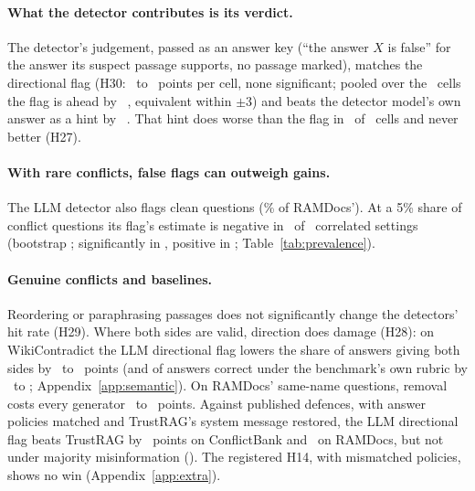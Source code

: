 \paragraph{What the detector contributes is its verdict.} The detector's judgement, passed as an answer key (``the
answer $X$ is false'' for the answer its suspect passage supports, no passage marked), matches the directional flag
(H30: \hThirtyAMin\ to \hThirtyAMax\ points per cell, none significant; pooled over the \PoolThirtyAK\ cells the flag
is ahead by \PoolThirtyA\ \PoolThirtyACI, equivalent within $\pm$3) and beats the detector model's own answer as a
hint by \PoolThirtyB\ \PoolThirtyBCI. That hint does worse than the flag in \nHTwentySevenAPos\ of
\nHTwentySevenATests\ cells and never better (H27).

\paragraph{With rare conflicts, false flags can outweigh gains.} The LLM detector also flags clean questions
(\cleanFprLlm\% of RAMDocs'). At a 5\% share of conflict questions its flag's estimate is negative in \prevNegFive\ of \prevN\ correlated settings
(bootstrap \prevNegFiveCI; significantly in \prevSigNeg, positive in \prevSigPos; Table~\ref{tab:prevalence}).

\paragraph{Genuine conflicts and baselines.} Reordering \citep{liu2024lost} or paraphrasing passages does not significantly
change the detectors' hit rate (H29). Where both sides are valid, direction does damage (H28): on WikiContradict the LLM directional
flag lowers the share of answers giving both sides by \ahTwentyEightWcMiniDir\ to \ahTwentyEightWcLunaDir\ points
(and of answers correct under the benchmark's own rubric by \awikiOrigMiniEffPt\ to \awikiOrigLunaEffPt;
Appendix~\ref{app:semantic}). On RAMDocs' same-name questions, removal costs every generator
\ahTwentyEightAmbMiniRem\ to \ahTwentyEightAmbLunaRem\ points. Against published defences, with answer policies matched and TrustRAG's
system message restored, the LLM directional flag beats TrustRAG by \blHFourteenCbs\ points on ConflictBank and
\blHFourteenRd\ on RAMDocs, but not under majority misinformation (\blHFourteenMj). The registered H14, with
mismatched policies, shows no win (Appendix~\ref{app:extra}).
